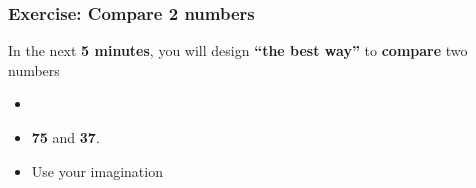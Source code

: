 \documentclass[xcolor=x11names,compress, aspectratio=169]{beamer}
\renewcommand{\(}{\begin{columns}}
\renewcommand{\)}{\end{columns}}
\newcommand{\<}[1]{\begin{column}{#1}}
\renewcommand{\>}{\end{column}}
\begin{document}
\begin{frame}
\begin{center}
\begin{itemize}
\end{itemize}
\end{center}
\end{frame}

\begin{frame}
\frametitle{\textcolor{brique}{Exercise:} Compare 2 numbers }

In the next \textcolor{brique}{\textbf{5 minutes}}, you will design \textbf{``the best way''} to {\color{brique}\textbf{compare}} two numbers\\

\begin{itemize}[<+-|alert@+>]
    \item[]
    \item[] \begin{center}
            {\huge \textbf{75}} and {\huge \textbf{37}}.\\
            \end{center}
    \item[]  Use your imagination
\end{itemize}
\end{frame}
\end{document}
